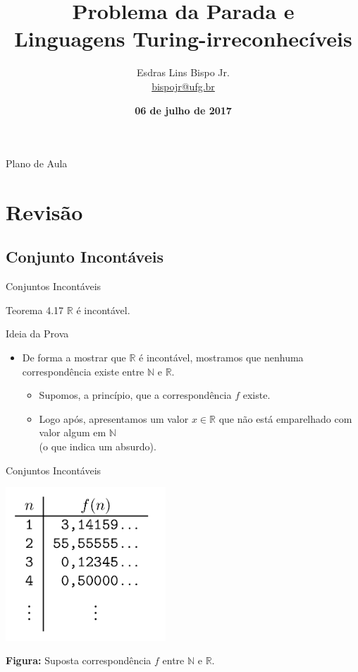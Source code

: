 \documentclass[xcolor=dvipsnames,table]{beamer}
\title{Problema da Parada e \\Linguagens Turing-irreconhecíveis}
\author{
  Esdras Lins Bispo Jr. \\ \url{bispojr@ufg.br}
  }
\institute{
  Teoria da Computação \\Bacharelado em Ciência da Computação}
\date{\textbf{06 de julho de 2017} }
\begin{document}
	\begin{frame}
		\titlepage
	\end{frame}

	\AtBeginSection{
		\begin{frame}{Sumário}%
    		\tableofcontents[currentsection]
		\end{frame}
	}

	\begin{frame}{Plano de Aula}
		\tableofcontents
	\end{frame}
    
    \section{Revisão}
	
	\subsection{Conjunto Incontáveis}

	\begin{frame}{Conjuntos Incontáveis}
		\begin{block}{Teorema 4.17}
			$\mathbb{R}$ é incontável.
		\end{block} 
		\begin{block}{Ideia da Prova}
			\begin{itemize}
				\item De forma a mostrar que $\mathbb{R}$ é incontável, mostramos que nenhuma correspondência existe entre $\mathbb{N}$ e $\mathbb{R}$.
				\begin{itemize}
					\item Supomos, a princípio, que a correspondência $f$ existe.
					\item Logo após, apresentamos um valor $x \in \mathbb{R}$ que não está emparelhado com valor algum em $\mathbb{N}$ \\(o que indica um absurdo).				
				\end{itemize}
			\end{itemize}
		\end{block}
	\end{frame}
	
	\begin{frame}{Conjuntos Incontáveis}
		\begin{center}
			\includegraphics[width=6cm]{images/fHip.png}
			
			{\bf Figura:} Suposta correspondência $f$ entre $\mathbb{N}$ e $\mathbb{R}$.
		\end{center}
	\end{frame}
	
\end{document}
